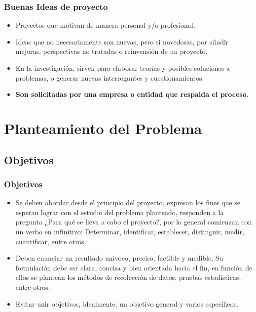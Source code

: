\documentclass[aspectratio=169]{beamer}%
\newcommand\naranjo[1]{\textcolor[RGB]{251,79,20}{#1}}
\begin{document}
\begin{frame}[fragile]
\frametitle{\textbf{Buenas Ideas de proyecto}}
\justifying
\begin{itemize}
 \item Proyectos que motivan de manera personal y/o profesional.
 \item Ideas que no necesariamente son nuevas, pero si novedosas, por añadir mejoras, perspectivas no tratadas o reinvensión de un proyecto.
 \item En la investigación, sirven para elaborar teorías y posibles soluciones a problemas, o generar nuevas interrogantes y cuestionamientos.
 \item \textbf{Son solicitadas por una empresa o entidad que respalda el proceso}.
\end{itemize}

\end{frame}


\section{Planteamiento del Problema}


\subsection{Objetivos}
\begin{frame}[fragile]
\frametitle{\textbf{Objetivos}}
\justifying
\begin{itemize}\justifying
 \item Se deben abordar desde el principio del proyecto, expresan los fines que se esperan lograr con el estudio del problema planteado, responden a la pregunta \naranjo{¿Para qué se lleva a cabo el proyecto?}, por lo general comienzan con un verbo en infinitivo: Determinar, identificar, establecer, distinguir, medir, cuantificar, entre otros.

\item Deben enunciar un resultado unívoco, preciso, factible y medible. Su formulación debe ser clara, concisa y bien orientada hacia el fin, en función de ellos se plantean los métodos de recolección de datos, pruebas estadísticas, entre otros.

\item Evitar unir objetivos, idealmente, un objetivo general y varios específicos.
\end{itemize}

\end{frame}
\end{document}
